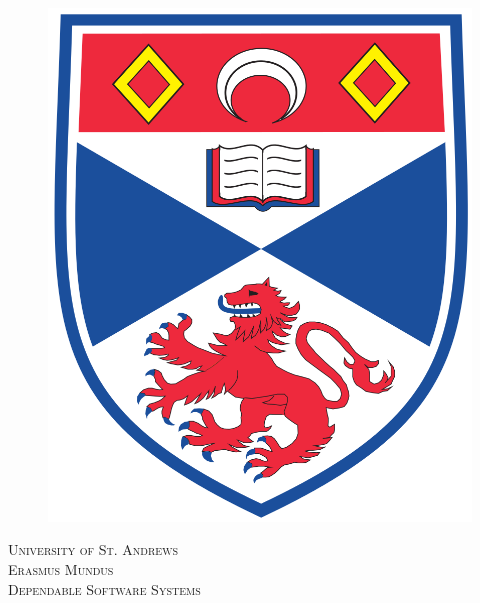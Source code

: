 \begin{titlepage}

\newcommand{\HRule}{\rule{\linewidth}{0.5mm}} %

\center %
 
\begin{figure}
    \centering
\includegraphics[scale=0.1]{ulogo.png}\\
\end{figure}
\textsc{\LARGE University of St. Andrews}\\[1cm] %

\textsc{\Large Erasmus Mundus}\\[0.5cm] %
\textsc{\large Dependable Software Systems}\\[0.5cm] %


\end{titlepage}
